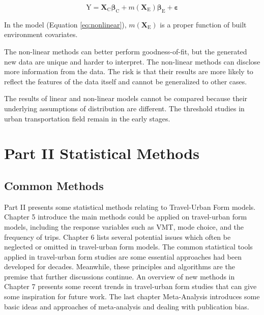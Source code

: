 \documentclass[
  11pt,
  openany]{memoir}
\begin{document}
\begin{equation}
\label{eq:nonlinear}
\mathrm{Y}=\mathbf{X}_\mathrm{C}\boldsymbol{\beta}_\mathrm{C}+m(\mathbf{X}_\mathrm{E})\boldsymbol{\beta}_\mathrm{E}+\boldsymbol{\varepsilon}
\end{equation}

In the model (Equation \eqref{eq:nonlinear}), \(m(\mathbf{X}_\mathrm{E})\) is a proper function of built environment covariates.

The non-linear methods can better perform goodness-of-fit, but the generated new data are unique and harder to interpret. The non-linear methods can disclose more information from the data. The risk is that their results are more likely to reflect the features of the data itself and cannot be generalized to other cases.

The results of linear and non-linear models cannot be compared because their underlying assumptions of distribution are different. The threshold studies in urban transportation field remain in the early stages.

\hypertarget{part-part-ii-statistical-methods}{%
\part*{Part II Statistical Methods}\label{part-part-ii-statistical-methods}}

\hypertarget{common-methods}{%
\chapter{Common Methods}\label{common-methods}}

Part II presents some statistical methods relating to Travel-Urban Form models.
Chapter 5 introduce the main methods could be applied on travel-urban form models, including the response variables such as VMT, mode choice, and the frequency of trips.
Chapter 6 lists several potential issues which often be neglected or omitted in travel-urban form models.
The common statistical tools applied in travel-urban form studies are some essential approaches had been developed for decades.
Meanwhile, these principles and algorithms are the premise that further discussions continue.
An overview of new methods in Chapter 7 presents some recent trends in travel-urban form studies that can give some inspiration for future work.
The last chapter Meta-Analysis introduces some basic ideas and approaches of meta-analysis and dealing with publication bias.
\end{document}
